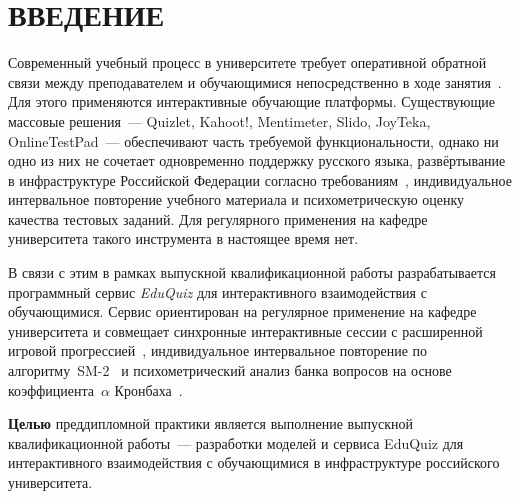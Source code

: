 \documentclass[14pt, a4paper]{extarticle}
\begin{document}






\section*{ВВЕДЕНИЕ}
\thispagestyle{plain}

Современный учебный процесс в университете требует оперативной обратной связи между преподавателем и обучающимися непосредственно в ходе занятия~\cite{sagindykova2015,braude2020}. Для этого применяются интерактивные обучающие платформы. Существующие массовые решения~--- Quizlet, Kahoot!, Mentimeter, Slido, JoyTeka, OnlineTestPad~--- обеспечивают часть требуемой функциональности, однако ни одно из них не сочетает одновременно поддержку русского языка, развёртывание в инфраструктуре Российской Федерации согласно требованиям~\cite{fz273}, индивидуальное интервальное повторение учебного материала и психометрическую оценку качества тестовых заданий. Для регулярного применения на кафедре университета такого инструмента в настоящее время нет.

В связи с этим в рамках выпускной квалификационной работы разрабатывается программный сервис \emph{EduQuiz} для интерактивного взаимодействия с обучающимися. Сервис ориентирован на регулярное применение на кафедре университета и совмещает синхронные интерактивные сессии с расширенной игровой прогрессией~\cite{sailer2020,koivisto2019}, индивидуальное интервальное повторение по алгоритму~SM-2~\cite{wozniak1990} и психометрический анализ банка вопросов на основе коэффициента~$\alpha$ Кронбаха~\cite{cronbach1951,crocker_algina}.

\textbf{Целью} преддипломной практики является выполнение выпускной квалификационной работы~--- разработки моделей и сервиса EduQuiz для интерактивного взаимодействия с обучающимися в инфраструктуре российского университета.
\end{document}

